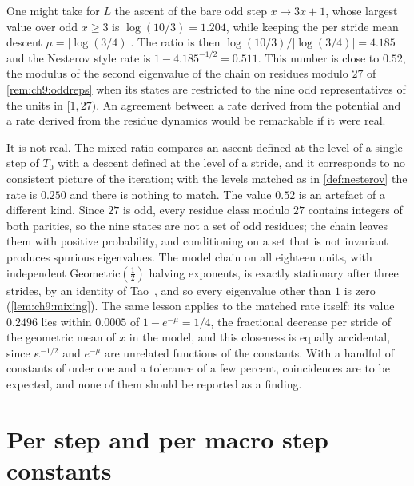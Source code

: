 \begin{remark}\label{rem:ch5:mixing}
One might take for $L$ the ascent of the bare odd step $x\mapsto3x+1$,
whose largest value over odd $x\ge3$ is $\log(10/3)=1.204$, while keeping the
per stride mean descent $\mu=|\log(3/4)|$.  The ratio is then
$\log(10/3)/|\log(3/4)|=4.185$ and the Nesterov style rate is
$1-4.185^{-1/2}=0.511$.  This number is close to $0.52$, the modulus of the
second eigenvalue of the chain on residues modulo $27$ of
\cref{rem:ch9:oddreps} when its states are restricted to the nine odd
representatives of the units in $[1,27)$.  An
agreement between a rate derived from the potential and a rate derived from
the residue dynamics would be remarkable if it were real.

It is not real.  The mixed ratio compares an ascent defined at the level of a
single step of $T_0$ with a descent defined at the level of a stride, and it
corresponds to no consistent picture of the iteration; with the levels
matched as in \cref{def:nesterov} the rate is $0.250$ and there is nothing to
match.  The value $0.52$ is an artefact of a different kind.  Since $27$ is
odd, every residue class modulo $27$ contains integers of both parities, so
the nine states are not a set of odd residues; the chain leaves them with
positive probability, and conditioning on a set that is not invariant produces
spurious eigenvalues.  The model chain on all eighteen units, with independent
Geometric$(\tfrac12)$ halving exponents, is exactly stationary after three
strides, by an identity of Tao~\cite[eq.~(1.21)]{tao2022}, and so every
eigenvalue other than $1$ is zero (\cref{lem:ch9:mixing}).  The same lesson applies to the matched rate itself:
its value $0.2496$ lies within $0.0005$ of $1-e^{-\mu}=1/4$, the
fractional decrease per stride of the geometric mean of $x$ in the model, and
this closeness is equally accidental, since $\kappa^{-1/2}$ and $e^{-\mu}$ are
unrelated functions of the constants.  With a handful of constants of order one and a tolerance of
a few percent, coincidences are to be expected, and none of them should be
reported as a finding.
\end{remark}

\section{Per step and per macro step constants}\label{sec:ch5:perstep}

